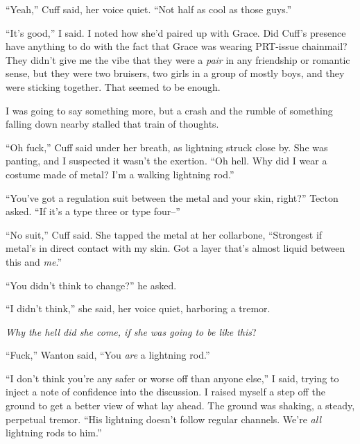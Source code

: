 ``Yeah,'' Cuff said, her voice quiet.  ``Not half as cool as those guys.''



``It's good,'' I said.  I noted how she'd paired up with Grace.  Did Cuff's presence have anything to do with the fact that Grace was wearing PRT-issue chainmail?  They didn't give me the vibe that they were a\emph{ pair }in any friendship or romantic sense, but they were two bruisers, two girls in a group of mostly boys, and they were sticking together.  That seemed to be enough.



I was going to say something more, but a crash and the rumble of something falling down nearby stalled that train of thoughts.



``Oh fuck,'' Cuff said under her breath, as lightning struck close by.  She was panting, and I suspected it wasn't the exertion.   ``Oh hell.  Why did I wear a costume made of metal?  I'm a walking lightning rod.''



``You've got a regulation suit between the metal and your skin, right?'' Tecton asked.  ``If it's a type three or type four--''



``No suit,'' Cuff said.  She tapped the metal at her collarbone, ``Strongest if metal's in direct contact with my skin.  Got a layer that's almost liquid between this and \emph{me}.''



``You didn't think to change?'' he asked.



``I didn't think,'' she said, her voice quiet, harboring a tremor.



\emph{Why the hell did she come, if she was going to be like this}?



``Fuck,'' Wanton said, ``You \emph{are} a lightning rod.''



``I don't think you're any safer or worse off than anyone else,'' I said, trying to inject a note of confidence into the discussion.  I raised myself a step off the ground to get a better view of what lay ahead.  The ground was shaking, a steady, perpetual tremor.  ``His lightning doesn't follow regular channels.  We're \emph{all} lightning rods to him.''



